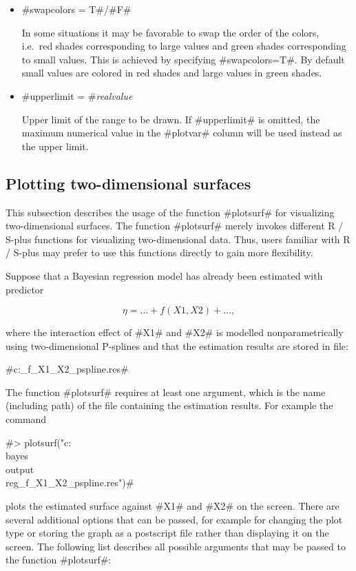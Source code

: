 \begin{itemize}
\item #swapcolors = T#/#F#

In some situations it may be favorable to swap the order of the
colors, i.e.~red shades corresponding to large values and green
shades corresponding to small values. This is achieved by specifying
#swapcolors=T#. By default small values are colored in red shades
and large values in green shades.

\item #upperlimit = #{\em realvalue}

Upper limit of the range to be drawn. If #upperlimit# is omitted,
the maximum numerical value in the #plotvar# column will be used
instead as the upper limit.

\end{itemize}

\subsection{Plotting two-dimensional surfaces}
\label{splusplotsurf}  

This subsection describes the usage of the function #plotsurf# for
visualizing two-dimensional surfaces. The function #plotsurf#
merely invokes different R / S-plus functions for visualizing
two-dimensional data. Thus, users familiar with R / S-plus may
prefer to use this functions directly to gain more flexibility.

Suppose that a Bayesian regression model has already been
estimated with predictor

$$
\eta = \dots + f(X1,X2) + \dots,
$$

where the interaction effect of #X1# and #X2# is modelled
nonparametrically using two-dimensional P-splines and that the
estimation results are stored in file:

#c:\bayes\output\reg_f_X1_X2_pspline.res#

The function #plotsurf# requires at least one argument, which is the
name (including path) of the file containing the estimation results.
For example the command

#> plotsurf("c:\\bayes\\output\\reg_f_X1_X2_pspline.res")#

plots the estimated surface against #X1# and #X2# on the screen.
There are several additional options that can be passed, for
example for changing the plot type or storing the graph as a
postscript file rather than displaying it on the screen. The
following list describes all possible arguments that may be passed
to the function #plotsurf#:

